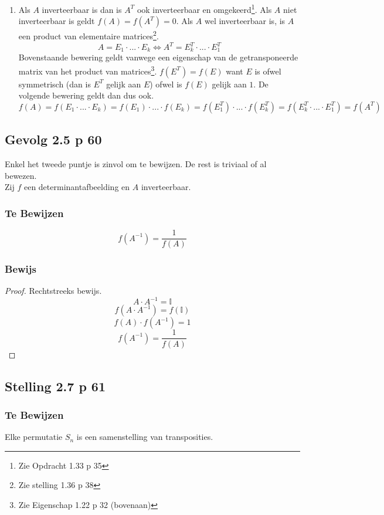 \documentclass[lineaire_algebra_oplossingen.tex]{subfiles}
\begin{document}
\begin{enumerate}
\[
f(A\cdot B) = f(E_1\cdot ...\cdot E_k \cdot B) = f(E_1\cdot ...\cdot E_k) \cdot f(B)) = f(A)\cdot f(B)
\]
De tweede gelijkheid volgt uit het feit dat $\forall A\in \mathbb{R}^{n\times n}: f(E\cdot A) = f(E)\cdot f(A)$ geldt\footnote{Zie stelling 2.3 p 58}.
\item 
Als $A$ inverteerbaar is dan is $A^T$ ook inverteerbaar en omgekeerd\footnote{Zie Opdracht 1.33 p 35}. Als $A$ niet inverteerbaar is geldt $f(A) = f(A^T)=0$. Als $A$ wel inverteerbaar is, is $A$ een product van elementaire matrices\footnote{Zie stelling 1.36 p 38}.
\[
A = E_1\cdot ...\cdot E_k \Leftrightarrow A^T =  E_k^T\cdot ...\cdot E_1^T
\]
Bovenstaande bewering geldt vanwege een eigenschap van de getransponeerde matrix van het product van matrices\footnote{Zie Eigenschap 1.22 p 32 (bovenaan)}. $f(E^T)=f(E)$ want $E$ is ofwel symmetrisch (dan is $E^T$ gelijk aan $E$) ofwel is $f(E)$ gelijk aan  $1$. De volgende bewering geldt dan dus ook.
\[
f(A) = f(E_1\cdot ...\cdot E_k) = f(E_1)\cdot ...\cdot f(E_k) = f(E_1^T)\cdot ...\cdot f(E_k^T) = f(E_k^T\cdot ...\cdot E_1^T) = f(A^T)
\]
\end{enumerate}

\subsection{Gevolg 2.5 p 60}
Enkel het tweede puntje is zinvol om te bewijzen. De rest is triviaal of al bewezen.\\
Zij $f$ een determinantafbeelding en $A$ inverteerbaar.
\subsubsection*{Te Bewijzen}
\[
f(A^{-1}) = \frac{1}{f(A)}
\]
\subsubsection*{Bewijs}
\begin{proof}
Rechtstreeks bewijs.\\
\[
A \cdot A^{-1} = \mathbb{I}
\]
\[
f(A \cdot A^{-1}) = f(\mathbb{I})
\]
\[
f(A) \cdot f(A^{-1}) = 1
\]
\[
f(A^{-1}) = \frac{1}{f(A)}
\]
\end{proof}

\subsection{Stelling 2.7 p 61}
\subsubsection*{Te Bewijzen}
Elke permutatie $S_n$ is een samenstelling van transposities.
\end{document}
